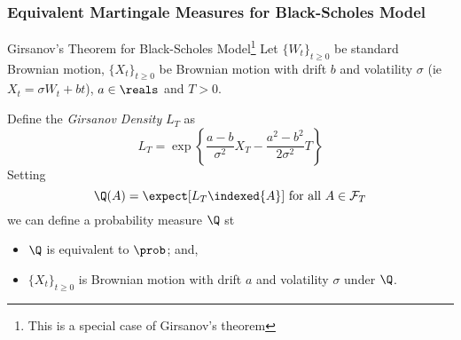 \documentclass[11pt,a4paper]{article}
\begin{document}
\subsubsection{Equivalent Martingale Measures for Black-Scholes Model}

  \begin{theorem}{Girsanov's Theorem for Black-Scholes Model\footnote{This is a special case of Girsanov's theorem}}\label{the_girsanov_theorem}
    Let $\{W_t\}_{t\geq0}$ be standard Brownian motion, $\{X_t\}_{t\geq0}$ be Brownian motion with drift $b$ and volatility $\sigma$ (ie $X_t=\sigma W_t+bt$), $a\in\reals$ and $T>0$.
    \par Define the \textit{Girsanov Density} $L_T$ as
    \[ L_T=\exp\left\{\frac{a-b}{\sigma^2}X_T-\frac{a^2-b^2}{2\sigma^2}T\right\} \]
    Setting
    \[ \Q(A)=\expect[L_T\indexed\{A\}]\text{ for all }A\in\mathcal{F}_T \]
    we can define a probability measure $\Q$ st
    \begin{itemize}
      \item $\Q$ is equivalent to $\prob$; and,
      \item $\{X_t\}_{t\geq0}$ is Brownian motion with drift $a$ and volatility $\sigma$ under $\Q$.
    \end{itemize}
  \end{theorem}
\end{document}
